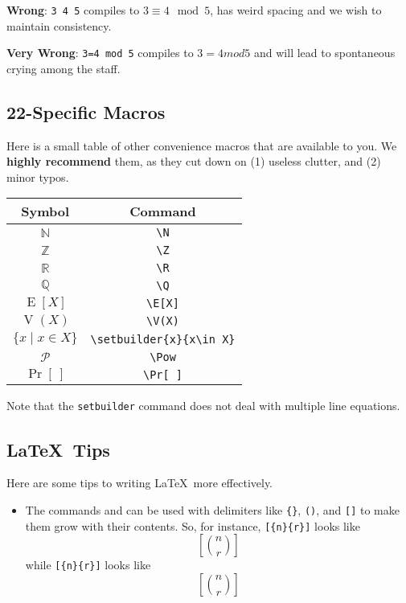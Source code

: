 {\begin{enumerate}
      \textbf{Wrong}: \texttt{3 4 5} compiles to $3\equiv 4\mod 5$, has weird spacing and we wish to maintain consistency.
      
      \textbf{Very Wrong}: \texttt{3=4 mod 5} compiles to $3=4 mod 5$ and will lead to spontaneous crying among the staff.    
  \end{enumerate}
  
  \subsection{22-Specific Macros}
    Here is a small table of other convenience macros that are available to you. We \textbf{highly recommend} them, as they cut down on (1) useless clutter, and (2) minor typos.
    
    \begin{center}
      \begin{tabular}{|c|c|}
        \hline
        \textbf{Symbol} & \textbf{Command} \\\hline
        $\mathbb{N}$ & \texttt{\textbackslash N} \\\hline
        $\mathbb{Z}$ & \texttt{\textbackslash Z} \\\hline
        $\mathbb{R}$ & \texttt{\textbackslash R} \\\hline
        $\mathbb{Q}$ & \texttt{\textbackslash Q} \\\hline
        $\operatorname{E}[X]$ & \texttt{\textbackslash E[X]} \\\hline
        $\operatorname{V}(X)$ & \texttt{\textbackslash V(X)} \\\hline
        $\{x\;|\;x\in X\}$ & \texttt{\textbackslash setbuilder\{x\}\{x\textbackslash in\ X\}} \\\hline
        $\mathcal{P}$ & \texttt{\textbackslash Pow} \\\hline
        $\Pr[\ ]$ & \texttt{\textbackslash Pr[\ ]} \\\hline
      \end{tabular}
    \end{center}
    
    Note that the \texttt{setbuilder} command does not deal with multiple line equations.
  
  \subsection{\LaTeX\ Tips}
    Here are some tips to writing \LaTeX\ more effectively. 
    \begin{itemize}
      \item The commands  and  can be used with delimiters like \texttt{\{\}}, \texttt{()}, and \texttt{[]} to make them grow with their contents. So, for instance, \texttt{[\{n\}\{r\}]} looks like \[[\binom nr]\] while \texttt{[\{n\}\{r\}]} looks like \[\left[\binom nr\right]\]
      

\end{itemize}}
